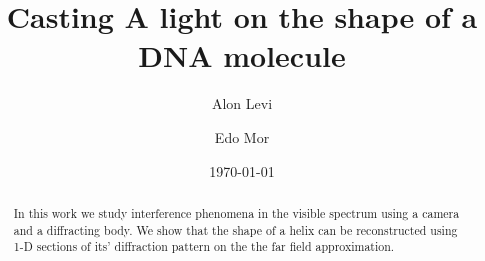 \documentclass[a4paper, amsfonts, amssymb, amsmath, reprint, showkeys, nofootinbib, twoside]{revtex4-2}
\begin{document}
    \title{Casting A light on the shape of a DNA molecule}
    \author{Alon Levi}
    \author{Edo Mor}
    \date{\today}
    \begin{abstract}
        In this work we study interference phenomena in the visible spectrum using a camera and a diffracting body.
        We show that the shape of a helix can be reconstructed using 1-D sections of its' diffraction pattern on the the far field approximation.
    \end{abstract}
    \maketitle

    
    
    
    
    
    
\end{document}
